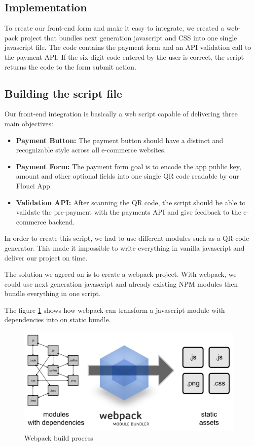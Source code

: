 \begin{spacing}{1.2}
\subsection{Implementation}
To create our front-end form and make it easy to integrate, we created a web-pack project that bundles next generation javascript and CSS into one single javascript file.
The code contains the payment form and an API validation call to the payment API.
If the six-digit code entered by the user is correct, the script returns the code to the form submit action.
\subsection{Building the script file}
Our front-end integration is basically a web script capable of delivering three main objectives:
\begin{itemize}
	\item \textbf{Payment Button:} The payment button should have a distinct and recognizable style across all e-commerce websites.
	\item \textbf{Payment Form:} The payment form goal is to encode the app public key, amount and other optional fields into one single QR code readable by our Flouci App.
	\item \textbf{Validation API:} After scanning the QR code, the script should be able to validate the pre-payment with the payments API and give feedback to the e-commerce backend.
\end{itemize}

In order to create this script, we had to use different modules such as a QR code generator. This made it impossible to write everything in vanilla javascript and deliver our project on time. 


The solution we agreed on is to create a webpack project. With webpack, we could use next generation javascript and already existing NPM modules then bundle everything in one script. 

The figure \ref{fig:webpack} shows how webpack can transform a javascript module with dependencies into on static bundle.
\begin{figure}[H]\centering
\includegraphics[width=\textwidth, keepaspectratio ]{webpack.png}
\caption{Webpack build process}
\label{fig:webpack}
\end{figure}


\end{spacing}

